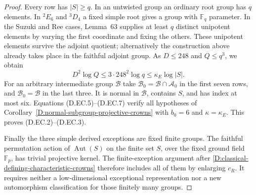 \begin{proof}
Every row has $|S|\geq q$. In an untwisted group an
ordinary root group has $q$ elements. In ${}^2E_6$ and
${}^3D_4$ a fixed simple root gives a group with
$\mathbb F_q$ parameter. In the Suzuki and Ree cases,
Lemma~63 supplies at least $q$ distinct unipotent
elements by varying the first coordinate and fixing
the others. These unipotent elements survive the
adjoint quotient; alternatively the construction above
already takes place in the faithful adjoint group.
As $D\leq248$ and $Q\leq q^3$, we obtain
\[
             D^2\log Q\leq3\cdot248^2\log q
                         \leq\kappa_E\log|S|.                \tag{D.EC.7}
\]
For an arbitrary intermediate group $\mathcal B$ take
$\mathcal B_0=\mathcal B\cap\mathcal A_0$ in the first
seven rows, and $\mathcal B_0=\mathcal B$ in the last
three. It is normal in $\mathcal B$, contains $S$,
and has index at most six. Equations (D.EC.5)--(D.EC.7)
verify all hypotheses of
Corollary~\ref{D:normal-subgroup-projective-crowns} with
$b_0=6$ and $\kappa=\kappa_E$. This proves (D.EC.2)--(D.EC.3).

Finally the three simple derived exceptions are fixed
finite groups. The faithful permutation action of
$\operatorname{Aut}(S)$ on the finite set $S$, over the
fixed ground field $\mathbb F_p$, has trivial projective
kernel. The finite-exception argument after
\ref{D:classical-defining-characteristic-crowns}
therefore includes all of them by enlarging $c_R$.
It requires neither a low-dimensional exceptional
representation nor a new automorphism classification
for those finitely many groups.
\end{proof}
